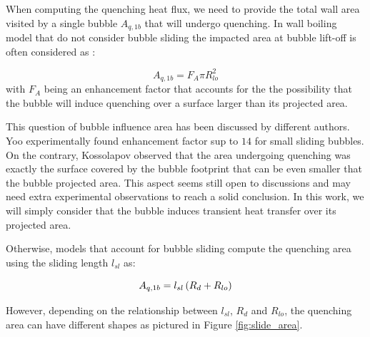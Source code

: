 When computing the quenching heat flux, we need to provide the total wall area visited by a single bubble $A_{q,1b}$ that will undergo quenching. In wall boiling model that do not consider bubble sliding \cite{kurul_multidimensional_1990, guelfi_neptune_2007, podowski_mechanistic_2008} the impacted area at bubble lift-off is often considered as :

\begin{equation}
A_{q,1b} = F_{A} \pi R_{lo}^{2}
\end{equation} 
with $F_{A}$ being an enhancement factor that accounts for the the possibility that the bubble will induce quenching over a surface larger than its projected area.

\begin{remark*}{}
This question of bubble influence area has been discussed by different authors. Yoo \etal \cite{yoo_area_2018} experimentally found enhancement factor sup to $14$ for small sliding bubbles. On the contrary, Kossolapov \cite{kossolapov_experimental_2021} observed that the area undergoing quenching was exactly the surface covered by the bubble footprint that can be even smaller that the bubble projected area. This aspect seems still open to discussions and may need extra experimental observations to reach a solid conclusion. In this work, we will simply consider that the bubble induces transient heat transfer over its projected area.
\end{remark*}


\npar

Otherwise, models that account for bubble sliding \cite{basu_wall_2005, yeoh_fundamental_2008, gilman_self-consistent_2017, kommajosyula_development_2020} compute the quenching area using the sliding length $l_{sl}$ as:

\begin{equation}
A_{q,1b} = l_{sl}\left( R_{d} + R_{lo} \right)
\end{equation}

However, depending on the relationship between $l_{sl}$, $R_{d}$ and $R_{lo}$, the quenching area can have different shapes as pictured in Figure \ref{fig:slide_area}.


